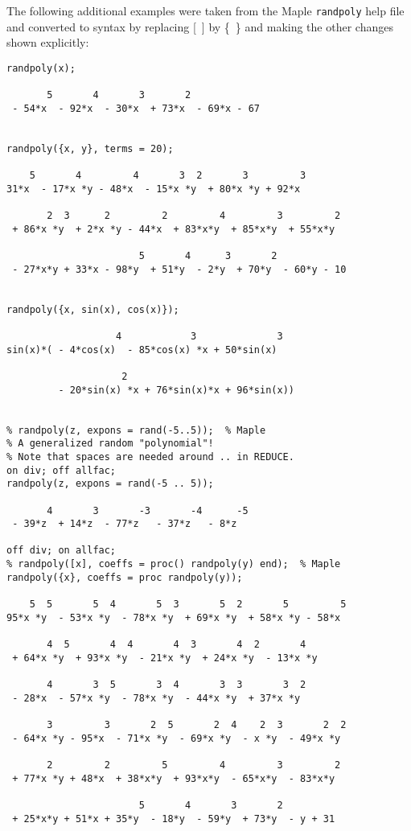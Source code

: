 The following additional examples were taken from the Maple \texttt{randpoly}
help file and converted to \REDUCE syntax by replacing [~] by
\{~\} and making the other changes shown explicitly:
\begin{verbatim}
randpoly(x);

       5       4       3       2
 - 54*x  - 92*x  - 30*x  + 73*x  - 69*x - 67


randpoly({x, y}, terms = 20);

    5       4         4       3  2       3         3
31*x  - 17*x *y - 48*x  - 15*x *y  + 80*x *y + 92*x

       2  3      2         2         4         3         2
 + 86*x *y  + 2*x *y - 44*x  + 83*x*y  + 85*x*y  + 55*x*y

                       5       4      3       2
 - 27*x*y + 33*x - 98*y  + 51*y  - 2*y  + 70*y  - 60*y - 10


randpoly({x, sin(x), cos(x)});

                   4            3              3
sin(x)*( - 4*cos(x)  - 85*cos(x) *x + 50*sin(x)

                    2
         - 20*sin(x) *x + 76*sin(x)*x + 96*sin(x))


% randpoly(z, expons = rand(-5..5));  % Maple
% A generalized random "polynomial"!
% Note that spaces are needed around .. in REDUCE.
on div; off allfac;
randpoly(z, expons = rand(-5 .. 5));

       4       3       -3       -4      -5
 - 39*z  + 14*z  - 77*z   - 37*z   - 8*z

off div; on allfac;
% randpoly([x], coeffs = proc() randpoly(y) end);  % Maple
randpoly({x}, coeffs = proc randpoly(y));

    5  5       5  4       5  3       5  2       5         5
95*x *y  - 53*x *y  - 78*x *y  + 69*x *y  + 58*x *y - 58*x

       4  5       4  4       4  3       4  2       4
 + 64*x *y  + 93*x *y  - 21*x *y  + 24*x *y  - 13*x *y

       4       3  5       3  4       3  3       3  2
 - 28*x  - 57*x *y  - 78*x *y  - 44*x *y  + 37*x *y

       3         3       2  5       2  4    2  3       2  2
 - 64*x *y - 95*x  - 71*x *y  - 69*x *y  - x *y  - 49*x *y

       2         2         5         4         3         2
 + 77*x *y + 48*x  + 38*x*y  + 93*x*y  - 65*x*y  - 83*x*y

                       5       4       3       2
 + 25*x*y + 51*x + 35*y  - 18*y  - 59*y  + 73*y  - y + 31



\end{verbatim}
